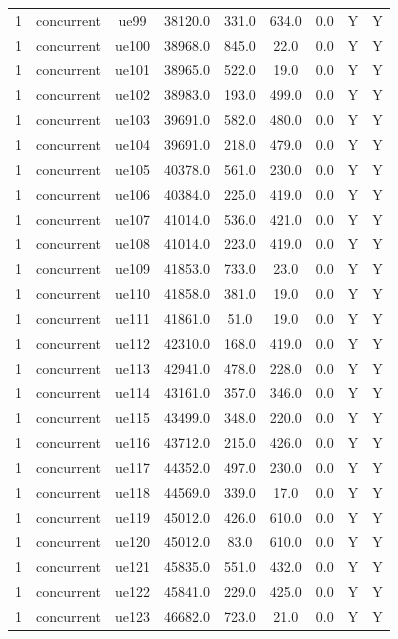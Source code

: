 \begin{table}[ht]
\begin{tabular}{|c|c|c|c|c|c|c|c|c|}
1 & concurrent & ue99 & 38120.0 & 331.0 & 634.0 & 0.0 & Y & Y \\
1 & concurrent & ue100 & 38968.0 & 845.0 & 22.0 & 0.0 & Y & Y \\
1 & concurrent & ue101 & 38965.0 & 522.0 & 19.0 & 0.0 & Y & Y \\
1 & concurrent & ue102 & 38983.0 & 193.0 & 499.0 & 0.0 & Y & Y \\
1 & concurrent & ue103 & 39691.0 & 582.0 & 480.0 & 0.0 & Y & Y \\
1 & concurrent & ue104 & 39691.0 & 218.0 & 479.0 & 0.0 & Y & Y \\
1 & concurrent & ue105 & 40378.0 & 561.0 & 230.0 & 0.0 & Y & Y \\
1 & concurrent & ue106 & 40384.0 & 225.0 & 419.0 & 0.0 & Y & Y \\
1 & concurrent & ue107 & 41014.0 & 536.0 & 421.0 & 0.0 & Y & Y \\
1 & concurrent & ue108 & 41014.0 & 223.0 & 419.0 & 0.0 & Y & Y \\
1 & concurrent & ue109 & 41853.0 & 733.0 & 23.0 & 0.0 & Y & Y \\
1 & concurrent & ue110 & 41858.0 & 381.0 & 19.0 & 0.0 & Y & Y \\
1 & concurrent & ue111 & 41861.0 & 51.0 & 19.0 & 0.0 & Y & Y \\
1 & concurrent & ue112 & 42310.0 & 168.0 & 419.0 & 0.0 & Y & Y \\
1 & concurrent & ue113 & 42941.0 & 478.0 & 228.0 & 0.0 & Y & Y \\
1 & concurrent & ue114 & 43161.0 & 357.0 & 346.0 & 0.0 & Y & Y \\
1 & concurrent & ue115 & 43499.0 & 348.0 & 220.0 & 0.0 & Y & Y \\
1 & concurrent & ue116 & 43712.0 & 215.0 & 426.0 & 0.0 & Y & Y \\
1 & concurrent & ue117 & 44352.0 & 497.0 & 230.0 & 0.0 & Y & Y \\
1 & concurrent & ue118 & 44569.0 & 339.0 & 17.0 & 0.0 & Y & Y \\
1 & concurrent & ue119 & 45012.0 & 426.0 & 610.0 & 0.0 & Y & Y \\
1 & concurrent & ue120 & 45012.0 & 83.0 & 610.0 & 0.0 & Y & Y \\
1 & concurrent & ue121 & 45835.0 & 551.0 & 432.0 & 0.0 & Y & Y \\
1 & concurrent & ue122 & 45841.0 & 229.0 & 425.0 & 0.0 & Y & Y \\
1 & concurrent & ue123 & 46682.0 & 723.0 & 21.0 & 0.0 & Y & Y \\

\end{tabular}
\end{table}
